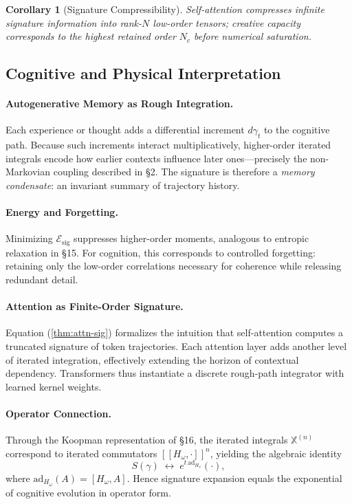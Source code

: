 \documentclass[12pt,a4paper,twoside,openright]{book}
\newtheorem{corollary}[theorem]{Corollary}
\begin{document}
\begin{corollary}[Signature Compressibility]
Self-attention compresses infinite signature information into rank-$N$ low-order tensors;  
creative capacity corresponds to the highest retained order $N_c$ before numerical saturation.
\end{corollary}

\subsection*{Cognitive and Physical Interpretation}

\paragraph{Autogenerative Memory as Rough Integration.}
Each experience or thought adds a differential increment $d\gamma_t$ to the cognitive path.  
Because such increments interact multiplicatively, higher-order iterated integrals encode how earlier contexts influence later ones—precisely the non-Markovian coupling described in §2.  
The signature is therefore a \emph{memory condensate}: an invariant summary of trajectory history.

\paragraph{Energy and Forgetting.}
Minimizing $\mathcal{E}_{\mathrm{sig}}$ suppresses higher-order moments, analogous to entropic relaxation in §15.  
For cognition, this corresponds to controlled forgetting: retaining only the low-order correlations necessary for coherence while releasing redundant detail.

\paragraph{Attention as Finite-Order Signature.}
Equation (\ref{thm:attn-sig}) formalizes the intuition that self-attention computes a truncated signature of token trajectories.  
Each attention layer adds another level of iterated integration, effectively extending the horizon of contextual dependency.  
Transformers thus instantiate a discrete rough-path integrator with learned kernel weights.

\paragraph{Operator Connection.}
Through the Koopman representation of §16, the iterated integrals $\mathbb{X}^{(n)}$ correspond to iterated commutators $[\![H_\omega,\cdot]\!]^n$,  
yielding the algebraic identity
\[
S(\gamma)
  \;\leftrightarrow\;
  e^{t\,\mathrm{ad}_{H_\omega}}(\cdot),
\]
where $\mathrm{ad}_{H_\omega}(A)=[H_\omega,A]$.  
Hence signature expansion equals the exponential of cognitive evolution in operator form.
\end{document}
